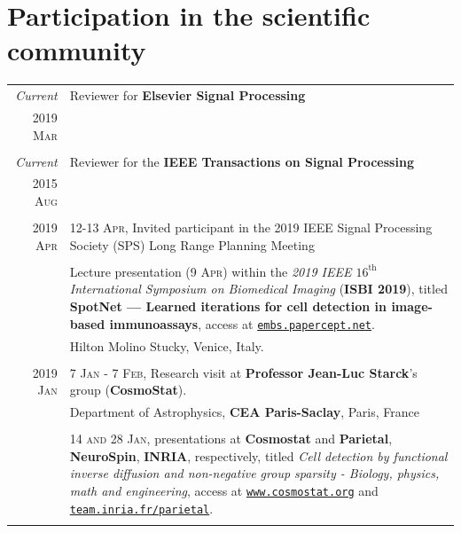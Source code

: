 \documentclass[a4paper,10pt]{article}
\begin{document}
  \section{Participation in the scientific community}
    
    \begin{longtable}[H]{r|p{13.5cm}}
      
      \emph{Current}	& Reviewer for \textbf{Elsevier Signal Processing} \\
      \textsc{2019 Mar} &  \\
       \\
      
      \emph{Current}	& Reviewer for the \textbf{IEEE Transactions on Signal Processing} \\
      \textsc{2015 Aug} &  \\
       \\
      
      
      \textsc{2019 Apr} &  \textsc{12-13 Apr}, Invited participant in the 2019 IEEE Signal Processing Society (SPS) Long Range Planning Meeting\\
      & \\
      & Lecture presentation (\textsc{9 Apr}) within the \emph{2019 IEEE $16^{\mathrm{th}}$ International
			  Symposium on Biomedical Imaging} (\textbf{ISBI 2019}), titled 
			  \textbf{SpotNet --- Learned iterations for cell detection in image-based immunoassays}, access at \href{https://embs.papercept.net/conferences/scripts/myprogram.pl?ConfID=79&Add=208}{\texttt{embs.papercept.net}}.\\
			  & \footnotesize{Hilton Molino Stucky, Venice, Italy.} \\  
			   \\
			  
			  
    
      \textsc{2019 Jan} & \textsc{7 Jan - 7 Feb}, Research visit at \textbf{Professor Jean-Luc Starck}'s group (\textbf{CosmoStat}). \\
                        & \footnotesize{Department of Astrophysics, \textbf{CEA Paris-Saclay}, Paris, France} \\
                        & \\
                        & \textsc{14 and 28 Jan}, presentations at \textbf{Cosmostat} and \textbf{Parietal}, \textbf{NeuroSpin}, \textbf{INRIA}, respectively, titled \emph{Cell detection by functional inverse diffusion and non-negative group sparsity - Biology, physics, math and engineering}, access at \href{http://www.cosmostat.org/events/cosmoclub/cosmosclub-pol}{\texttt{www.cosmostat.org}} and \href{https://team.inria.fr/parietal/slides-of-pol-del-aguila-plas-talk-available-now-online/}{\texttt{team.inria.fr/parietal}}. \\
       \\
    

\end{longtable}
\end{document}
